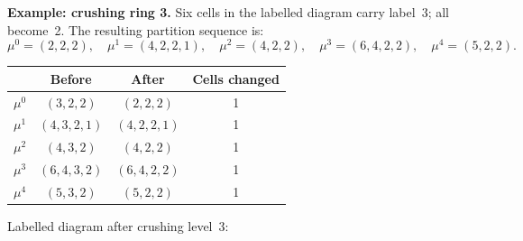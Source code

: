\documentclass[11pt]{article}
\theoremstyle{plain}
\theoremstyle{definition}
\begin{document}
\begin{center}
\end{center}




\bigskip
\noindent\textbf{Example: crushing ring 3.}
Six cells in the labelled diagram carry label~3; all become~2.
The resulting partition sequence is:
\[
  \mu^0 = (2,2,2),\quad
  \mu^1 = (4,2,2,1),\quad
  \mu^2 = (4,2,2),\quad
  \mu^3 = (6,4,2,2),\quad
  \mu^4 = (5,2,2).
\]

\medskip
\begin{center}
\renewcommand{\arraystretch}{1.2}
\begin{tabular}{c|c|c|c}
  & \textbf{Before} & \textbf{After} & \textbf{Cells changed} \\ \hline
$\mu^0$ & $(3,2,2)$ & $(2,2,2)$ & 1 \\
$\mu^1$ & $(4,3,2,1)$ & $(4,2,2,1)$ & 1 \\
$\mu^2$ & $(4,3,2)$ & $(4,2,2)$ & 1 \\
$\mu^3$ & $(6,4,3,2)$ & $(6,4,2,2)$ & 1 \\
$\mu^4$ & $(5,3,2)$ & $(5,2,2)$ & 1
\end{tabular}
\end{center}

\newcommand{\pcell}[3]{%
  \fill[white] (#1, -#2) rectangle ++(1,-1);
  \draw (#1, -#2) rectangle ++(1,-1);
  \node[font=\small] at (#1+0.5, -#2-0.5) {$#3$};
}

\newpage

\noindent Labelled diagram after crushing level~3:
\end{document}
